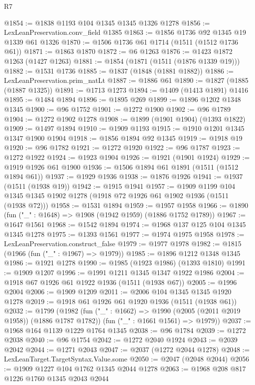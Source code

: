 \begin{lexlean}{R7}
\begin{coremodule}
@1854 := @1838 @1193 @104 @1345 @1345 @1326 @1278
@1856 := LexLeanPreservation.conv_field @1385
@1863 := @1856 @1736 @92 @1345 @19 @1339 @61 @1326
@1870 := @1506 @1736 @61 @1714 (@1511 (@1512 @1736 @61))
@1871 := @1863 @1870
@1872 := @6 @1263
@1876 := @1423 @1872 @1263 (@1427 @1263)
@1881 := @1854 (@1871 (@1511 (@1876 @1339 @19)))
@1882 := @1531 @1736
@1885 := @1837 (@1848 (@1881 @1882))
@1886 := LexLeanPreservation.prim_natLt
@1887 := @1886 @61
@1890 := @1827 (@1885 (@1887 @1325))
@1891 := @1713 @1273
@1894 := @1409 (@1413 @1891) @1416
@1895 := @1484 @1894
@1896 := @1895 @269
@1899 := @1896 @1202 @1348 @1345
@1900 := @96 @1752
@1901 := @1272 @1900
@1902 := @96 @1789
@1904 := @1272 @1902 @1278
@1908 := @1899 (@1901 @1904) (@1393 @1822)
@1909 := @1497 @1894
@1910 := @1909 @1193
@1915 := @1910 @1201 @1345 @1347 @1900 @1904
@1918 := @1856 @1894 @92 @1345
@1919 := @1918 @19
@1920 := @96 @1782
@1921 := @1272 @1920
@1922 := @96 @1787
@1923 := @1272 @1922
@1924 := @1923 @1904
@1926 := @1921 (@1901 @1924)
@1929 := @1919 @1926 @61 @1900
@1936 := @1506 @1894 @61 @1891 (@1511 (@1512 @1894 @61))
@1937 := @1929 @1936
@1938 := @1876 @1926
@1941 := @1937 (@1511 (@1938 @19))
@1942 := @1915 @1941
@1957 := @1909
    @1199
    @104
    @1345
    @1345
    @1902
    @1278
    (@1918 @72 @1926 @61 @1902 @1936 (@1511 (@1938 @72)))
@1958 := @1531 @1894
@1959 := @1957 @1958
@1966 := @1890 (fun ("_" : @1648) => @1908 (@1942 @1959) (@1886 @1752 @1789))
@1967 := @1647 @1561
@1968 := @1542 @1894
@1974 := @1968 @137 @125 @104 @1345 @1345 @1278
@1975 := @1393 @1561
@1977 := @1974 @1975 @1958
@1978 := LexLeanPreservation.construct_false
@1979 := @1977 @1978
@1982 := @1815 (@1966 (fun ("_" : @1967) => @1979))
@1985 := @1896 @1212 @1348 @1345
@1986 := @1921 @1278
@1990 := @1985 (@1923 @1986) (@1393 @1810)
@1991 := @1909 @1207
@1996 := @1991 @1211 @1345 @1347 @1922 @1986
@2004 := @1918 @67 @1926 @61 @1922 @1936 (@1511 (@1938 @67))
@2005 := @1996 @2004
@2006 := @1909 @1209
@2011 := @2006 @104 @1345 @1345 @1920 @1278
@2019 := @1918 @61 @1926 @61 @1920 @1936 (@1511 (@1938 @61))
@2032 := @1799
    (@1982
      (fun ("_" : @1662) => @1990 (@2005 (@2011 @2019 @1958)) (@1886 @1787 @1782))
      (fun ("_" : @1661 @1561) => @1979))
@2037 := @1968 @164 @1139 @1229 @1764 @1345
@2038 := @96 @1784
@2039 := @1272 @2038
@2040 := @96 @1754
@2042 := @1272 @2040 @1924
@2043 := @2039 @2042
@2044 := @1271 @2043
@2047 := @2037 (@1272 @2044 @1278)
@2048 := LexLeanTarget.TargetSyntax.Value.some
@2050 := @2047 (@2048 @2044)
@2056 := @1909 @1227 @104 @1762 @1345 @2044 @1278
@2063 := @1968 @208 @817 @1226 @1760 @1345 @2043 @2044

\end{coremodule}
\end{lexlean}
